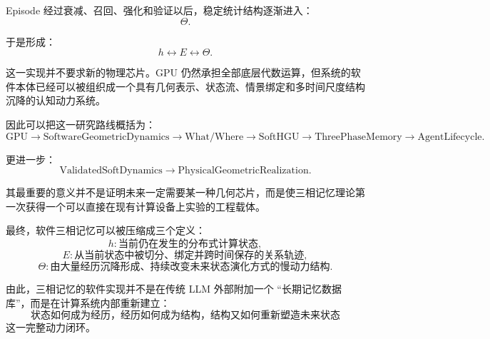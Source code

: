 Episode 经过衰减、召回、强化和验证以后，稳定统计结构逐渐进入：
\[
\Theta.
\]

于是形成：
\[
\boxed{
h
\leftrightarrow
E
\leftrightarrow
\Theta.
}
\]

这一实现并不要求新的物理芯片。GPU 仍然承担全部底层代数运算，但系统的软件本体已经可以被组织成一个具有几何表示、状态流、情景绑定和多时间尺度结构沉降的认知动力系统。

因此可以把这一研究路线概括为：
\[
\boxed{
\mathrm{GPU}
\rightarrow
\mathrm{SoftwareGeometricDynamics}
\rightarrow
\mathrm{What/Where}
\rightarrow
\mathrm{SoftHGU}
\rightarrow
\mathrm{ThreePhaseMemory}
\rightarrow
\mathrm{AgentLifecycle}.
}
\]

更进一步：
\[
\boxed{
\mathrm{ValidatedSoftDynamics}
\rightarrow
\mathrm{PhysicalGeometricRealization}.
}
\]

其最重要的意义并不是证明未来一定需要某一种几何芯片，而是使三相记忆理论第一次获得一个可以直接在现有计算设备上实验的工程载体。

最终，软件三相记忆可以被压缩成三个定义：
\[
\boxed{
h:
\text{当前仍在发生的分布式计算状态},
}
\]
\[
\boxed{
E:
\text{从当前状态中被切分、绑定并跨时间保存的关系轨迹},
}
\]
\[
\boxed{
\Theta:
\text{由大量经历沉降形成、持续改变未来状态演化方式的慢动力结构}.
}
\]

由此，三相记忆的软件实现并不是在传统 LLM 外部附加一个 ``长期记忆数据库''，而是在计算系统内部重新建立：
\[
\boxed{
\text{状态如何成为经历，经历如何成为结构，结构又如何重新塑造未来状态}
}
\]
这一完整动力闭环。